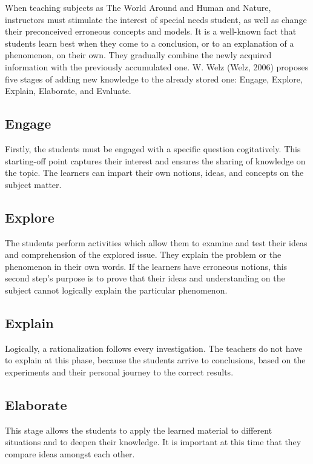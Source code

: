 \documentclass[11.5pt]{sig-alternate} %
\begin{document}
\begin{large}
When teaching subjects as The World Around and Human and Nature, instructors must stimulate the interest of special needs student, as well as change their preconceived erroneous concepts and models. It is a well-known fact that students learn best when they come to a conclusion, or to an explanation of a phenomenon, on their own. They gradually combine the newly acquired information with the previously accumulated one. W. Welz (Welz, 2006) proposes five stages of adding new knowledge to the already stored one: Engage, Explore, Explain, Elaborate, and Evaluate.

\subsection*{Engage}

Firstly, the students must be engaged with a specific question cogitatively. This starting-off point captures their interest and ensures the sharing of knowledge on the topic. The learners can impart their own notions, ideas, and concepts on the subject matter.

\subsection*{Explore}

The students perform activities which allow them to examine and test their ideas and comprehension of the explored issue. They explain the problem or the phenomenon in their own words. If the learners have erroneous notions, this second step’s purpose is to prove that their ideas and understanding on the subject cannot logically explain the particular phenomenon.

\subsection*{Explain}

Logically, a rationalization follows every investigation. The teachers do not have to explain at this phase, because the students arrive to conclusions, based on the experiments and their personal journey to the correct results. 

\subsection*{Elaborate}

This stage allows the students to apply the learned material to different situations and to deepen their knowledge. It is important at this time that they compare ideas amongst each other.


\end{large}
\end{document}
